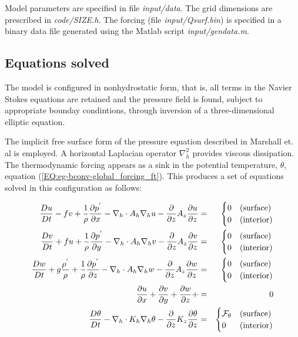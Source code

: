 Model parameters are specified in file {\it input/data}. The grid dimensions are
prescribed in {\it code/SIZE.h}. The forcing (file {\it input/Qsurf.bin}) is specified 
in a binary data file generated using the Matlab script {\it input/gendata.m}.

\subsection{Equations solved}
\label{www:tutorials}

The model is configured in nonhydrostatic form, that is, all terms in the Navier 
Stokes equations are retained and the pressure field is found, subject to appropriate
bounday condintions, through inversion of a three-dimensional elliptic equation. 

The implicit free surface form of the
pressure equation described in Marshall et. al \cite{marshall:97a} is
employed. A horizontal Laplacian operator $\nabla_{h}^2$ provides viscous
dissipation. The thermodynamic forcing appears as a sink in the potential temperature, 
$\theta$, equation (\ref{EQ:eg-bconv-global_forcing_ft}). This produces a set of equations 
solved in this configuration as follows:

\begin{eqnarray}
\label{EQ:eg-bconv-model_equations}
\frac{Du}{Dt} - fv + 
  \frac{1}{\rho}\frac{\partial p^{'}}{\partial x} - 
  \nabla_{h}\cdot A_{h}\nabla_{h}u - 
  \frac{\partial}{\partial z}A_{z}\frac{\partial u}{\partial z} 
 & = &
\begin{cases}
0 & \text{(surface)} \\
0 & \text{(interior)}
\end{cases}
\\
\frac{Dv}{Dt} + fu + 
  \frac{1}{\rho}\frac{\partial p^{'}}{\partial y} - 
  \nabla_{h}\cdot A_{h}\nabla_{h}v - 
  \frac{\partial}{\partial z}A_{z}\frac{\partial v}{\partial z} 
& = &
\begin{cases}
0 & \text{(surface)} \\
0 & \text{(interior)}
\end{cases}
\\
\frac{Dw}{Dt} + g \frac{\rho^{'}}{\rho} + 
  \frac{1}{\rho}\frac{\partial p^{'}}{\partial z} - 
  \nabla_{h}\cdot A_{h}\nabla_{h}w - 
  \frac{\partial}{\partial z}A_{z}\frac{\partial w}{\partial z} 
& = &
\begin{cases}
0 & \text{(surface)} \\
0 & \text{(interior)}
\end{cases}
\\
\frac{\partial u}{\partial x} + 
\frac{\partial v}{\partial y} + 
\frac{\partial w}{\partial z} + 
&=&
0
\\
\frac{D\theta}{Dt} -
 \nabla_{h}\cdot K_{h}\nabla_{h}\theta
 - \frac{\partial}{\partial z}K_{z}\frac{\partial\theta}{\partial z} 
& = &
\begin{cases}
{\cal F}_\theta & \text{(surface)} \\
0 & \text{(interior)}
\end{cases}
\end{eqnarray}

